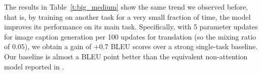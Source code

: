 The results in Table~\ref{t:big_medium} show the same trend we observed
before, that is, by training on another task for a very small
fraction of time, the model improves its performance on its main task.
Specifically, with 5 parameter updates for image caption generation per 100
updates for translation (so the mixing ratio of $0.05$), we obtain a 
gain of +$0.7$ BLEU scores over a strong single-task baseline. Our baseline is
almost a BLEU point better than the equivalent non-attention model reported in
\cite{luong15attn}.

